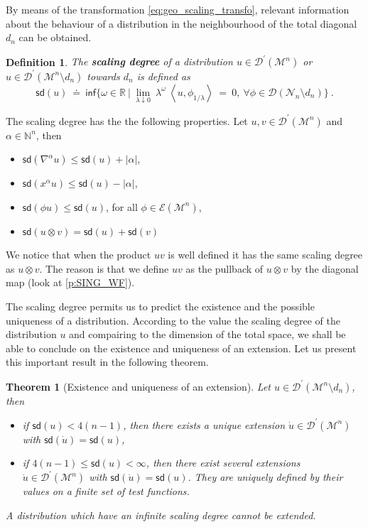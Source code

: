 \documentclass[11pt]{book}
\newcommand{\sd}{\mathsf{sd}}
\renewcommand{\inf}{\mathsf{inf}}
\newcommand{\abs}[1]{\left|#1\right|}
\newcommand{\sm}[1]{\left\langle#1\right\rangle}
\newcommand{\Dcal}{\mathcal{D}}
\newcommand{\Ecal}{\mathcal{E}}
\newcommand{\Mcal}{\mathcal{M}}
\newcommand{\Ncal}{\mathcal{N}}
\newcommand{\Nbb}{\mathbb{N}}
\newcommand{\Rbb}{\mathbb{R}}
\theoremstyle{break}
\newtheorem{theorem}{Theorem}[chapter]
\newtheorem{definition}{Definition}[chapter]
\begin{document}
By means of the transformation \eqref{eq:geo_scaling_transfo}, relevant information about the behaviour of a distribution in the neighbourhood of the total diagonal $d_n$ can be obtained. 


\begin{definition}\label{def:scaling_degree}
The \textbf{scaling degree} of a distribution $u \in \Dcal^\prime(\Mcal^n)$ or $u \in \Dcal^\prime(\Mcal^n \setminus d_n)$ towards $d_n$ is defined as 
%
\begin{equation*}
\sd(u) \ \doteq \ \inf\bigg\{ \omega \in \Rbb \ \bigg| \ \lim_{\lambda \downarrow 0} \ \lambda^\omega \ \sm{u,\phi_{1/\lambda}} \ = \ 0, \ \forall \phi\in\Dcal(\Ncal_n\setminus d_n) \bigg\} \ .
\end{equation*}
%
\end{definition}


The scaling degree has the the following properties. Let $u, v \in\Dcal^\prime(\Mcal^n)$ and $\alpha \in \Nbb^n$, then
%
\begin{itemize}
\setlength\itemsep{0pt}
\item $\sd(\nabla^\alpha u) \leq \sd(u) + \abs{\alpha}$,
\item $\sd(x^\alpha u) \leq \sd(u) - \abs{\alpha}$,
\item $\sd(\phi u) \leq \sd(u)$, for all $\phi \in \Ecal(\Mcal^n)$, 
\item $\sd(u \otimes v) = \sd(u) + \sd(v)$
\end{itemize}
%
We notice that when the product $uv$ is well defined it has the same scaling degree as $u \otimes v$. The reason is that we define $uv$ as the pullback of $u \otimes v$ by the diagonal map (look at \ref{p:SING_WF}).


The scaling degree permits us to predict the existence and the possible uniqueness of a distribution. According to the value the scaling degree of the distribution $u$ and compairing to the dimension of the total space, we shall be able to conclude on the existence and uniqueness of an extension. Let us present this important result in the following theorem.


\begin{theorem}[Existence and uniqueness of an extension] \label{theo:extension_distribution}
Let $u \in \Dcal^\prime(\Mcal^n \setminus d_n )$, then
%
\vspace*{-5pt}
\begin{itemize}
\setlength\itemsep{0pt}
\item if $\sd(u) < 4(n-1)$, then there exists a unique extension $\dot{u} \in \Dcal^\prime(\Mcal^n)$ with $\sd(\dot{u})=\sd(u)$,
%
\item if $4(n-1)\leq\sd(u)<\infty$, then there exist several extensions $\dot{u} \in \Dcal^\prime(\Mcal^n)$ with $\sd(\dot{u})=\sd(u)$. They are uniquely defined by their values on a finite set of test functions.
\end{itemize}
%
A distribution which have an infinite scaling degree cannot be extended.
\end{theorem}
\end{document}
